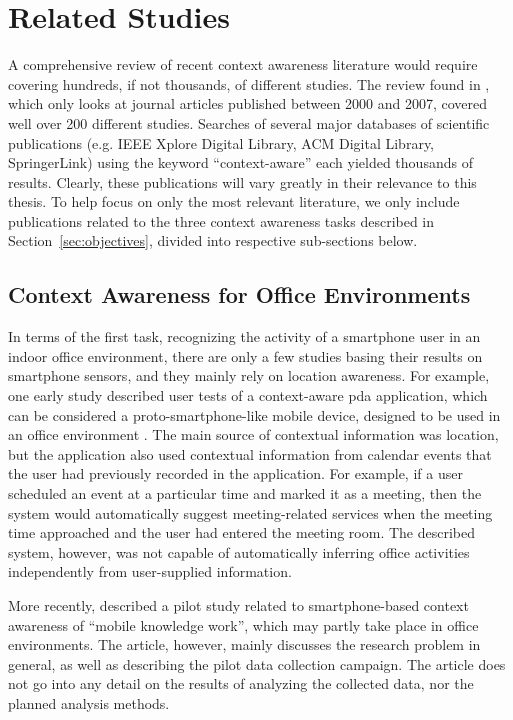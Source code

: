 \section{Related Studies}
\label{sec:literature}

A comprehensive review of recent context awareness literature would require covering hundreds, if not thousands, of different studies. The review found in \cite{Hong2009}, which only looks at journal articles published between 2000 and 2007, covered well over 200 different studies.  Searches of several major databases of scientific publications (e.g. IEEE Xplore Digital Library, ACM Digital Library, SpringerLink) using the keyword ``context-aware'' each yielded thousands of results. Clearly, these publications will vary greatly in their relevance to this thesis. To help focus on only the most relevant literature, we only include publications related to the three context awareness tasks described in Section~\ref{sec:objectives}, divided into respective sub-sections below.

\subsection{Context Awareness for Office Environments}
\label{sec:office-literature}

In terms of the first task, recognizing the activity of a smartphone user in an indoor office environment, there are only a few studies basing their results on smartphone sensors, and they mainly rely on location awareness. For example, one early study described user tests of a context-aware \gls{pda} application, which can be considered a proto-smartphone-like mobile device, designed to be used in an office environment \cite{Tahti2004}. The main source of contextual information was location, but the application also used contextual information from calendar events that the user had previously recorded in the application. For example, if a user scheduled an event at a particular time and marked it as a meeting, then the system would automatically suggest meeting-related services when the meeting time approached and the user had entered the meeting room. The described system, however, was not capable of automatically inferring office activities independently from user-supplied information.

More recently, \cite{heiskala2014research} described a pilot study related to smartphone-based context awareness of ``mobile knowledge work'', which may partly take place in office environments. The article, however, mainly discusses the research problem in general, as well as describing the pilot data collection campaign. The article does not go into any detail on the results of analyzing the collected data, nor the planned analysis methods.


